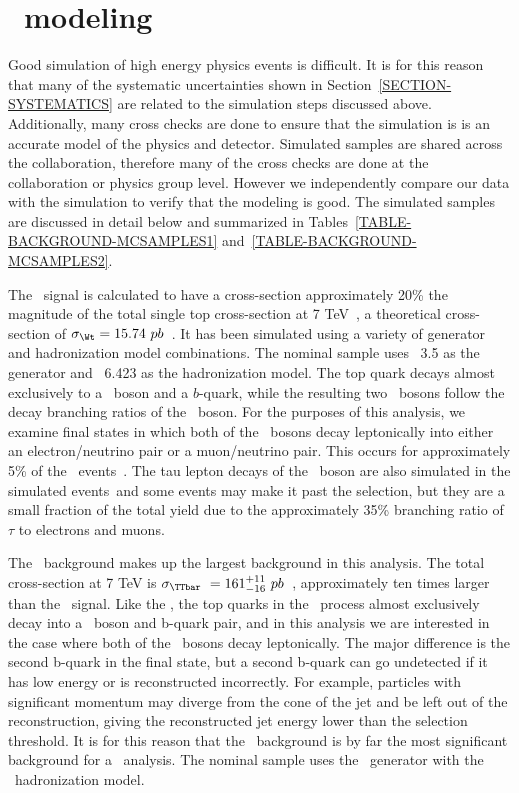 \section{\MC\ modeling}

\label{SECTION-BACKGROUND-MC}

Good simulation of high energy physics events is difficult. It is for this reason that many of the systematic uncertainties shown in Section~\ref{SECTION-SYSTEMATICS} are related to the simulation steps discussed above. Additionally, many cross checks are done to ensure that the simulation is is an accurate model of the physics and detector. Simulated samples are shared across the collaboration, therefore many of the cross checks are done at the collaboration or physics group level. However we independently compare our data with the simulation to verify that the modeling is good. The simulated samples are discussed in detail below and summarized in Tables~\ref{TABLE-BACKGROUND-MCSAMPLES1} and~\ref{TABLE-BACKGROUND-MCSAMPLES2}.

The \Wt\ signal is calculated to have a cross-section approximately 20\% the magnitude of the total single top cross-section at 7 TeV~\cite{SGTOP-XS1,SGTOP-XS2,SGTOP-XS3}, a theoretical cross-section of $\sigma_{\Wt} = 15.74\ pb$~\cite{SGTOP-XS2}. It has been simulated using a variety of generator and hadronization model combinations. The nominal sample uses \AcerMC\ 3.5 as the generator and \Pythia\ 6.423 as the hadronization model. The top quark decays almost exclusively to a \Wboson\ boson and a $b$-quark, while the resulting two \Wboson\ bosons follow the decay branching ratios of the \Wboson\ boson. For the purposes of this analysis, we examine final states in which both of the \Wboson\ bosons decay leptonically into either an electron/neutrino pair or a muon/neutrino pair. This occurs for approximately 5\% of the \Wt\ events~\cite{PDG}. The tau lepton decays of the \Wboson\ boson are also simulated in the simulated events\ and some events may make it past the selection, but they are a small fraction of the total yield due to the approximately 35\% branching ratio of $\tau$ to electrons and muons.

The \TTbar\ background makes up the largest background in this analysis. The total cross-section at 7 TeV is $\sigma_{\TTbar}\ = 161^{+11}_{-16}\ pb$~\cite{TTBARXS}, approximately ten times larger than the \Wt\ signal. Like the \Wtchan, the top quarks in the \TTbar\ process almost exclusively decay into a \Wboson\ boson and b-quark pair, and in this analysis we are interested in the case where both of the \Wboson\ bosons decay leptonically. The major difference is the second b-quark in the final state, but a second b-quark can go undetected if it has low energy or is reconstructed incorrectly. For example, particles with significant momentum may diverge from the cone of the jet and be left out of the reconstruction, giving the reconstructed jet energy lower than the selection threshold. It is for this reason that the \TTbar\ background is by far the most significant background for a \Wtchan\ analysis. The nominal sample uses the \MCNLO\ generator with the \HERWIG\ hadronization model.

